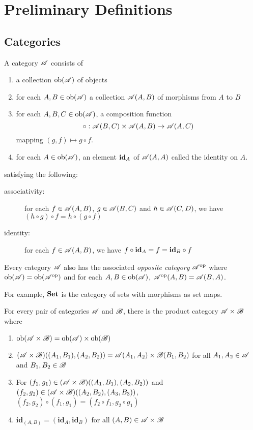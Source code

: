 \section{Preliminary Definitions}

\subsection{Categories}
\begin{definition}[Category]
    A category $\mathscr{A}$ consists of 
    \begin{enumerate}
        \item a collection $\operatorname{ob}(\mathscr{A})$ of objects 
        \item for each $A,B\in\operatorname{ob}(\mathscr{A})$ a collection $\mathscr{A}(A,B)$ of morphisms from $A$ to $B$ 
        \item for each $A,B,C\in\operatorname{ob}(\mathscr{A})$, a composition function 
        \begin{equation*}
            \circ: \mathscr{A}(B,C)\times\mathscr{A}(A,B)\to\mathscr{A}(A,C)
        \end{equation*}
        mapping $(g,f)\mapsto g\circ f$.
        \item for each $A\in\operatorname{ob}(\mathscr{A})$, an element $\mathbf{id}_A$ of $\mathscr{A}(A,A)$ called the identity on $A$.
    \end{enumerate}

    \noindent satisfying the following: 
    \begin{description}
        \item[associativity:] for each $f\in\mathscr{A}(A,B)$, $g\in\mathscr{A}(B,C)$ and $h\in\mathscr{A}(C,D)$, we have $(h\circ g)\circ f = h\circ (g\circ f)$
        \item[identity:] for each $f\in\mathscr{A}(A,B)$, we have $f\circ\mathbf{id}_A = f = \mathbf{id}_B\circ f$
    \end{description}

    Every category $\mathscr{A}$ also has the associated \textit{opposite category} $\mathscr{A}^{\text{op}}$ where $\operatorname{ob}(\mathscr{A}) = \operatorname{ob}(\mathscr{A}^{\text{op}})$ and for each $A,B\in\operatorname{ob}(\mathscr{A})$, $\mathscr{A}^{\text{op}}(A,B) = \mathscr{A}(B,A)$.
\end{definition}

For example, $\mathbf{Set}$ is the category of sets with morphisms as set maps.

\begin{definition}
    For every pair of categories $\mathscr{A}$ and $\mathscr{B}$, there is the product category $\mathscr{A}\times\mathscr{B}$ where 
    \begin{enumerate}[label=(\alph*)]
    \item $\operatorname{ob}(\mathscr{A}\times\mathscr{B}) = \operatorname{ob}(\mathscr{A})\times\operatorname{ob}(\mathscr{B})$
    \item $(\mathscr{A}\times\mathscr{B})((A_1,B_1), (A_2,B_2)) = \mathscr{A}(A_1,A_2)\times\mathscr{B}(B_1,B_2)$ for all $A_1,A_2\in\mathscr{A}$ and $B_1,B_2\in\mathscr{B}$
    \item For $(f_1,g_1)\in(\mathscr{A}\times\mathscr{B})((A_1,B_1), (A_2,B_2))$ and $(f_2,g_2)\in(\mathscr{A}\times\mathscr{B})((A_2,B_2), (A_3,B_3))$, $(f_2,g_2)\circ(f_1,g_1) = (f_2\circ f_1, g_2\circ g_1)$
    \item $\mathbf{id}_{(A,B)} = (\mathbf{id}_A,\mathbf{id}_B)$ for all $(A,B)\in\mathscr{A}\times\mathscr{B}$
    \end{enumerate}
\end{definition}

